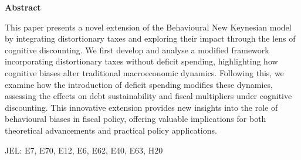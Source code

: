 \documentclass[11pt]{article}
\newcommand{\bb}{\bigbreak\noindent}
\begin{document}
\begin{spacing}{2}
\begin{center}
\begin{minipage}{0.80\linewidth}
	\vspace{3cm}
\begin{center}
	{\Large \textbf{Abstract}\par}
\end{center}
\bb
This paper presents a novel extension of the Behavioural New Keynesian model by integrating distortionary taxes and exploring their impact through the lens of cognitive discounting. We first develop and analyse a modified framework incorporating distortionary taxes without deficit spending, highlighting how cognitive biases alter traditional macroeconomic dynamics. Following this, we examine how the introduction of deficit spending modifies these dynamics, assessing the effects on debt sustainability and fiscal multipliers under cognitive discounting. This innovative extension provides new insights into the role of behavioural biases in fiscal policy, offering valuable implications for both theoretical advancements and practical policy applications.
\vspace{1cm}
\begin{center}
	JEL: E7, E70, E12, E6, E62, E40, E63, H20
\end{center}

\end{minipage}
\end{center}
\pagebreak
\tableofcontents

\pagebreak
{}






\end{spacing}
\end{document}
